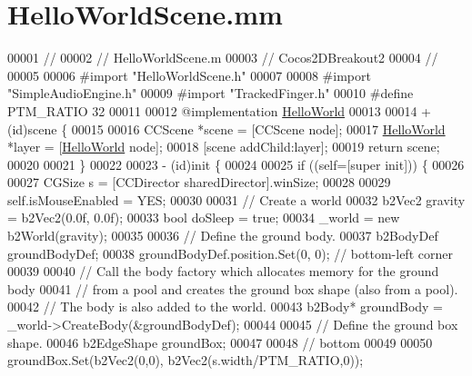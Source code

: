 \hypertarget{_hello_world_scene_8mm}{\section{Hello\-World\-Scene.\-mm}
\label{db/d25/_hello_world_scene_8mm}
}

\begin{DoxyCode}
00001 \textcolor{comment}{//}
00002 \textcolor{comment}{//  HelloWorldScene.m}
00003 \textcolor{comment}{//  Cocos2DBreakout2}
00004 \textcolor{comment}{//}
00005 
00006 \textcolor{preprocessor}{#import "HelloWorldScene.h"}
00007 
00008 \textcolor{preprocessor}{#import "SimpleAudioEngine.h"}
00009 \textcolor{preprocessor}{#import "TrackedFinger.h"}
00010 \textcolor{preprocessor}{#define PTM\_RATIO 32}
00011 \textcolor{preprocessor}{}
00012 \textcolor{keyword}{@implementation }\hyperlink{interface_hello_world}{HelloWorld}
00013 
00014 + (id)scene \{
00015  
00016     CCScene *scene = [CCScene node];
00017     \hyperlink{interface_hello_world}{HelloWorld} *layer = [\hyperlink{interface_hello_world}{HelloWorld} node];
00018     [scene addChild:layer];
00019     \textcolor{keywordflow}{return} scene;
00020     
00021 \}
00022 
00023 - (id)init \{
00024  
00025     \textcolor{keywordflow}{if} ((\textcolor{keyword}{self}=[super init])) \{
00026         
00027         CGSize s = [CCDirector sharedDirector].winSize;
00028 
00029         \textcolor{keyword}{self}.isMouseEnabled = YES;
00030         
00031         \textcolor{comment}{// Create a world}
00032         b2Vec2 gravity = b2Vec2(0.0f, 0.0f);
00033         \textcolor{keywordtype}{bool} doSleep = \textcolor{keyword}{true};
00034         \_world = \textcolor{keyword}{new} b2World(gravity);
00035 
00036         \textcolor{comment}{// Define the ground body.}
00037         b2BodyDef groundBodyDef;
00038         groundBodyDef.position.Set(0, 0); \textcolor{comment}{// bottom-left corner}
00039         
00040         \textcolor{comment}{// Call the body factory which allocates memory for the ground body}
00041         \textcolor{comment}{// from a pool and creates the ground box shape (also from a pool).}
00042         \textcolor{comment}{// The body is also added to the world.}
00043         b2Body* groundBody = \_world->CreateBody(&groundBodyDef);
00044         
00045         \textcolor{comment}{// Define the ground box shape.}
00046         b2EdgeShape groundBox;
00047         
00048         \textcolor{comment}{// bottom}
00049         
00050         groundBox.Set(b2Vec2(0,0), b2Vec2(s.width/PTM\_RATIO,0));

\end{DoxyCode}
